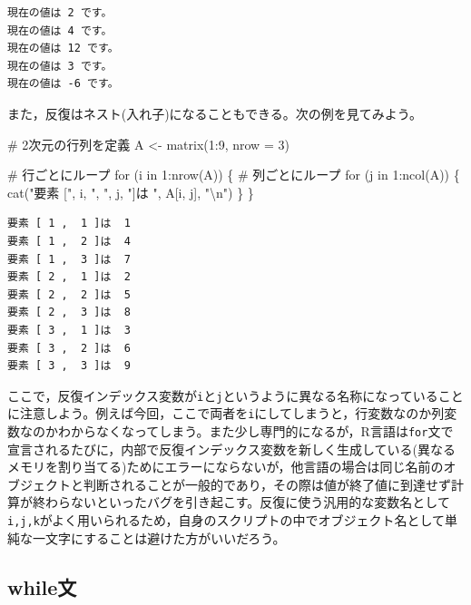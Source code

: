 \documentclass[
  a4paper,
]{ltjsbook}
\newenvironment{Shaded}{\begin{snugshade}}{\end{snugshade}}
\newcommand{\AttributeTok}[1]{\textcolor[rgb]{0.40,0.45,0.13}{#1}}
\newcommand{\CommentTok}[1]{\textcolor[rgb]{0.37,0.37,0.37}{#1}}
\newcommand{\ControlFlowTok}[1]{\textcolor[rgb]{0.00,0.23,0.31}{#1}}
\newcommand{\DecValTok}[1]{\textcolor[rgb]{0.68,0.00,0.00}{#1}}
\newcommand{\FunctionTok}[1]{\textcolor[rgb]{0.28,0.35,0.67}{#1}}
\newcommand{\NormalTok}[1]{\textcolor[rgb]{0.00,0.23,0.31}{#1}}
\newcommand{\OtherTok}[1]{\textcolor[rgb]{0.00,0.23,0.31}{#1}}
\newcommand{\SpecialCharTok}[1]{\textcolor[rgb]{0.37,0.37,0.37}{#1}}
\newcommand{\StringTok}[1]{\textcolor[rgb]{0.13,0.47,0.30}{#1}}
\begin{document}
\begin{verbatim}
現在の値は 2 です。
現在の値は 4 です。
現在の値は 12 です。
現在の値は 3 です。
現在の値は -6 です。
\end{verbatim}

また，反復はネスト(入れ子)になることもできる。次の例を見てみよう。

\begin{Shaded}
\begin{Highlighting}[]
\CommentTok{\# 2次元の行列を定義}
\NormalTok{A }\OtherTok{\textless{}{-}} \FunctionTok{matrix}\NormalTok{(}\DecValTok{1}\SpecialCharTok{:}\DecValTok{9}\NormalTok{, }\AttributeTok{nrow =} \DecValTok{3}\NormalTok{)}

\CommentTok{\# 行ごとにループ}
\ControlFlowTok{for}\NormalTok{ (i }\ControlFlowTok{in} \DecValTok{1}\SpecialCharTok{:}\FunctionTok{nrow}\NormalTok{(A)) \{}
  \CommentTok{\# 列ごとにループ}
  \ControlFlowTok{for}\NormalTok{ (j }\ControlFlowTok{in} \DecValTok{1}\SpecialCharTok{:}\FunctionTok{ncol}\NormalTok{(A)) \{}
    \FunctionTok{cat}\NormalTok{(}\StringTok{"要素 ["}\NormalTok{, i, }\StringTok{", "}\NormalTok{, j, }\StringTok{"]は "}\NormalTok{, A[i, j], }\StringTok{"}\SpecialCharTok{\textbackslash{}n}\StringTok{"}\NormalTok{)}
\NormalTok{  \}}
\NormalTok{\}}
\end{Highlighting}
\end{Shaded}

\begin{verbatim}
要素 [ 1 ,  1 ]は  1 
要素 [ 1 ,  2 ]は  4 
要素 [ 1 ,  3 ]は  7 
要素 [ 2 ,  1 ]は  2 
要素 [ 2 ,  2 ]は  5 
要素 [ 2 ,  3 ]は  8 
要素 [ 3 ,  1 ]は  3 
要素 [ 3 ,  2 ]は  6 
要素 [ 3 ,  3 ]は  9 
\end{verbatim}

ここで，反復インデックス変数が\texttt{i}と\texttt{j}というように異なる名称になっていることに注意しよう。例えば今回，ここで両者を\texttt{i}にしてしまうと，行変数なのか列変数なのかわからなくなってしまう。また少し専門的になるが，R言語は\texttt{for}文で宣言されるたびに，内部で反復インデックス変数を新しく生成している(異なるメモリを割り当てる)ためにエラーにならないが，他言語の場合は同じ名前のオブジェクトと判断されることが一般的であり，その際は値が終了値に到達せず計算が終わらないといったバグを引き起こす。反復に使う汎用的な変数名として\texttt{i,j,k}がよく用いられるため，自身のスクリプトの中でオブジェクト名として単純な一文字にすることは避けた方がいいだろう。

\subsection{while文}\label{whileux6587}
\end{document}
